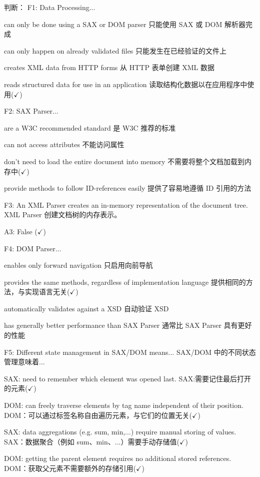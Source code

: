 \documentclass[fontset=windows]{article}
\begin{document}
判断：
F1: Data Processing...

\indent\indent can only be done using a SAX or DOM parser 只能使用 SAX 或 DOM 解析器完成

\indent\indent can only happen on already validated files 只能发生在已经验证的文件上

\indent\indent creates XML data from HTTP forms 从 HTTP 表单创建 XML 数据

\indent\indent reads structured data for use in an application 读取结构化数据以在应用程序中使用($\checkmark$)

F2: SAX Parser...

\indent\indent are a W3C recommended standard 是 W3C 推荐的标准

\indent\indent can not access attributes 不能访问属性

\indent\indent don't need to load the entire document into memory 不需要将整个文档加载到内存中($\checkmark$)

\indent\indent provide methods to follow ID-references easily 提供了容易地遵循 ID 引用的方法

F3: An XML Parser creates an in-memory representation of the document tree. XML Parser 创建文档树的内存表示。

A3: False ($\checkmark$)

F4: DOM Parser...

\indent\indent enables only forward navigation 只启用向前导航

\indent\indent provides the same methods, regardless of implementation language 提供相同的方法，与实现语言无关($\checkmark$)

\indent\indent automatically validates against a XSD 自动验证 XSD

\indent\indent has generally better performance than SAX Parser 通常比 SAX Parser 具有更好的性能

F5: Different state management in SAX/DOM means... SAX/DOM 中的不同状态管理意味着...

\indent\indent SAX: need to remember which element was opened last. SAX:需要记住最后打开的元素($\checkmark$)

\indent\indent DOM: can freely traverse elements by tag name independent of their position. DOM：可以通过标签名称自由遍历元素，与它们的位置无关($\checkmark$)

\indent\indent SAX: data aggregations (e.g. sum, min,...) require manual storing of values. SAX：数据聚合（例如 sum、min、...）需要手动存储值($\checkmark$)

\indent\indent DOM: getting the parent element requires no additional stored references. DOM：获取父元素不需要额外的存储引用($\checkmark$)
\end{document}
